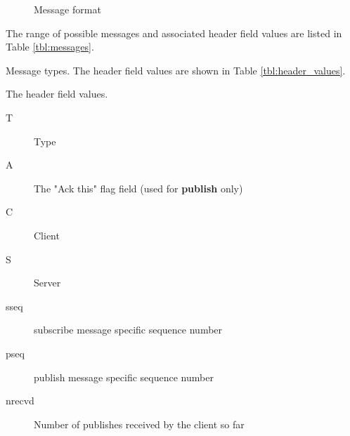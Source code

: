 \documentclass[a4paper]{article}
\begin{document}
\begin{figure}
	\begin{center}
		
		\caption{Message format}
		\label{fig:header}
	\end{center}
\end{figure}

The range of possible messages and associated header field values are listed in Table 
\ref{tbl:messages}.

\begin{table}
\begin{center}
\caption{Message types. The header field values are shown in Table \ref{tbl:header_values}.}

\label{tbl:messages}
\end{center}
\end{table}

\begin{table}
\caption{The header field values.}
\begin{description}
  \item[T] Type
  \item[A] The "Ack this" flag field (used for \textbf{publish} only)
  \item[C] Client
  \item[S] Server
  \item[sseq] subscribe message specific sequence number
  \item[pseq] publish message specific sequence number
  \item[nrecvd] Number of publishes received by the client so far
\end{description}
\label{tbl:header_values}
\end{table}

\pagebreak
\end{document}
